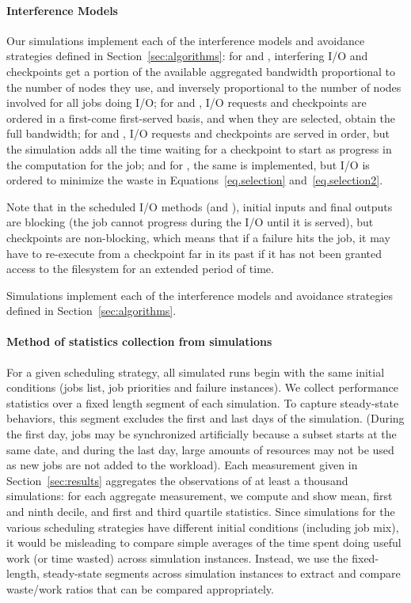 \ifTR

\paragraph*{Interference Models} Our simulations implement each of the
interference models and avoidance strategies defined in
Section~\ref{sec:algorithms}: for \propfixed and \propdaly,
interfering I/O and checkpoints get a portion of the available
aggregated bandwidth proportional to the number of nodes they use, and
inversely proportional to the number of nodes involved for all
jobs doing I/O; for \bfifofixed and \bfifodaly, I/O requests
and checkpoints are ordered in a first-come first-served basis, and
when they are selected, obtain the full bandwidth; for \fifofixed and
\fifodaly, I/O requests and checkpoints are served in order, but the
simulation adds all the time waiting for a checkpoint to start as
progress in the computation for the job; and for \cooperative,
the same is implemented, but I/O is ordered to minimize the waste in
Equations~\eqref{eq.selection} and~\eqref{eq.selection2}.

Note that in the scheduled I/O methods (\fifononblock and \cooperative),
initial inputs and final outputs are blocking (the job cannot progress during
the I/O until it is served), but checkpoints are non-blocking, which means that
if a failure hits the job, it may have to re-execute from a checkpoint far in
its past if it has  not been granted access to the filesystem for an extended
period of time.

\else

Simulations implement each of the interference models and avoidance
strategies defined in Section~\ref{sec:algorithms}.
\fi

\paragraph*{Method of statistics collection from simulations}
For a given scheduling strategy, all simulated runs begin with the
same initial conditions (jobs list, job priorities and failure
instances).  We collect performance statistics over a fixed length
segment of each simulation.  To capture steady-state behaviors, this
segment excludes the first and last days of the simulation. (During
the first day, jobs may be synchronized artificially because a subset
starts at the same date, and during the last day, large amounts of
resources may not be used as new jobs are not added to the workload).
Each measurement given in Section~\ref{sec:results} aggregates the
observations of at least a thousand simulations: for each aggregate
measurement, we compute and show mean, first and ninth decile, and
first and third quartile statistics.  Since simulations for the
various scheduling strategies have different initial conditions
(including job mix), it would be misleading to compare simple averages
of the time spent doing useful work (or time wasted) across simulation
instances. Instead, we use the fixed-length, steady-state segments
across simulation instances to extract and compare waste/work ratios
that can be compared appropriately.

